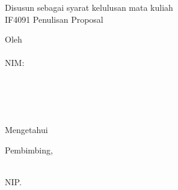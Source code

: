 
\clearpage
\pagestyle{empty}

\begin{center}

    \Large\bfseries\MakeUppercase{\judulta}

    \vfill

    \Large \subtitle

    \vfill

    \large Disusun sebagai syarat kelulusan mata kuliah\\
    IF4091 Penulisan Proposal

    \vfill

    \large Oleh \\[0.3em]
    \MakeUppercase{\penulis} \\[0.2em]
    NIM: \nim \\

    \prodi \\
	\normalsize \normalfont
	\fakultasplain \\
	\itb \\

    \vfill

    \tanggallengkap\\
    Mengetahui

    \vspace{0.5cm}
    Pembimbing,

    \vfill

    \underline{\pembimbing}\\
    NIP. \nip

\end{center}

\clearpage
